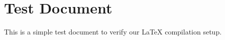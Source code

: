 \documentclass{article}
\begin{document}
\section{Test Document}
This is a simple test document to verify our LaTeX compilation setup.
\end{document}
